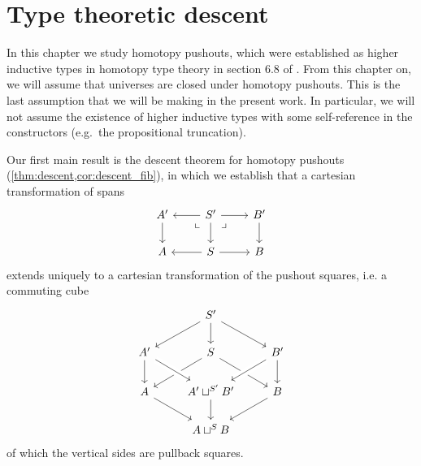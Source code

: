 \chapter{Type theoretic descent}\label{chap:descent}

In this chapter we study homotopy pushouts, which were established as higher inductive types in homotopy type theory in section 6.8 of \cite{hottbook}. From this chapter on, we will assume that universes are closed under homotopy pushouts. This is the last assumption that we will be making in the present work. In particular, we will not assume the existence of higher inductive types with some self-reference in the constructors (e.g.~the propositional truncation).

Our first main result is the descent theorem for homotopy pushouts (\cref{thm:descent,cor:descent_fib}), in which we establish that a cartesian transformation of spans
\begin{equation*}
\begin{tikzcd}
A' \arrow[d]  & S' \arrow[l] \arrow[r] \arrow[d] \arrow[dl,phantom,"\llcorner" very near start] \arrow[dr,phantom,"\lrcorner" very near start] & B' \arrow[d] \\
A & S \arrow[l] \arrow[r] & B
\end{tikzcd}
\end{equation*}
extends uniquely to a cartesian transformation of the pushout squares, i.e. a commuting cube
\begin{equation*}
\begin{tikzcd}
& S' \arrow[dl] \arrow[dr] \arrow[d] \\
A' \arrow[d] & S \arrow[dl] \arrow[dr] & B' \arrow[dl,crossing over] \arrow[d] \\
A \arrow[dr] & A'\sqcup^{S'}B' \arrow[d] \arrow[from=ul,crossing over] & B \arrow[dl] \\
& A\sqcup^S B
\end{tikzcd}
\end{equation*}
of which the vertical sides are pullback squares.

